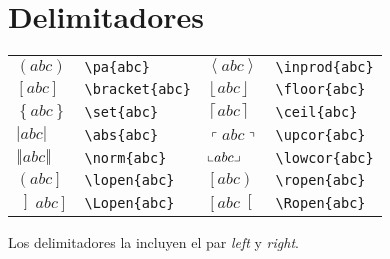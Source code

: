 \documentclass[10pt, a4paper]{article}
\newcommand{\pa}[1]{\left( #1 \right)}
\newcommand{\bracket}[1]{\left[ #1 \right]}
\newcommand{\set}[1]{\left\{ #1 \right\}}
\newcommand{\abs}[1]{\left\vert #1 \right\vert}
\newcommand{\norm}[1]{\left\Vert #1 \right\Vert}
\newcommand{\inprod}[1]{\left\langle #1 \right\rangle}
\newcommand{\floor}[1]{\left\lfloor #1 \right\rfloor}
\newcommand{\ceil}[1]{\left\lceil #1 \right\rceil}
\newcommand{\upcor}[1]{\left\ulcorner #1 \right\urcorner}
\newcommand{\lowcor}[1]{\left\llcorner #1 \right\lrcorner}
\newcommand{\lopen}[1]{\left( #1 \right]}
\newcommand{\ropen}[1]{\left[ #1 \right)}
\newcommand{\Lopen}[1]{\left] #1 \right]}
\newcommand{\Ropen}[1]{\left[ #1 \right[}
\begin{document}
\section{Delimitadores}
\begin{center}
	\begin{tabular}{ll|ll}
		$ \pa{abc} $ & \texttt{\textbackslash pa\{abc\}} & $ \inprod{abc} $ & \texttt{\textbackslash inprod\{abc\}}\\
		$ \bracket{abc} $ & \texttt{\textbackslash bracket\{abc\}} & $ \floor{abc} $ & \texttt{\textbackslash floor\{abc\}}\\
		$ \set{abc} $ & \texttt{\textbackslash set\{abc\}} & $ \ceil{abc} $ & \texttt{\textbackslash ceil\{abc\}}\\
		$ \abs{abc} $ & \texttt{\textbackslash abs\{abc\}} & $ \upcor{abc} $ & \texttt{\textbackslash upcor\{abc\}}\\
		$ \norm{abc} $ & \texttt{\textbackslash norm\{abc\}} & $ \lowcor{abc} $ & \texttt{\textbackslash lowcor\{abc\}}\\
		$ \lopen{abc} $ & \texttt{\textbackslash lopen\{abc\}} & $ \ropen{abc} $ & \texttt{\textbackslash ropen\{abc\}}\\
		$ \Lopen{abc} $ & \texttt{\textbackslash Lopen\{abc\}} & $ \Ropen{abc} $ & \texttt{\textbackslash Ropen\{abc\}}
	\end{tabular}
\end{center}
Los delimitadores la incluyen el par \emph{left} y \emph{right}.
\end{document}
